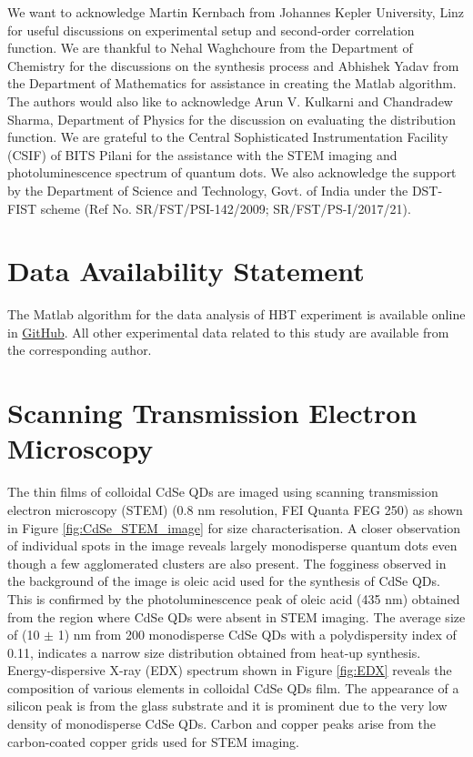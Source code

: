 \documentclass[%
 aip,
 amsmath,amssymb,
 reprint,%
]{revtex4-1}
\begin{document}
\begin{acknowledgments}
We want to acknowledge Martin Kernbach from Johannes Kepler University, Linz for useful discussions on experimental setup and second-order correlation function. We are thankful to Nehal Waghchoure from the Department of Chemistry for the discussions on the synthesis process and Abhishek Yadav from the Department of Mathematics for assistance in creating the Matlab algorithm. The authors would also like to acknowledge Arun V. Kulkarni and Chandradew Sharma, Department of Physics for the discussion on evaluating the distribution function. We are grateful to the Central Sophisticated Instrumentation Facility (CSIF) of BITS Pilani for the assistance with the STEM imaging and photoluminescence spectrum of quantum dots.  We also acknowledge the support by the Department of Science and Technology, Govt. of India under the DST-FIST scheme (Ref No. SR/FST/PSI-142/2009; SR/FST/PS-I/2017/21).
\end{acknowledgments}

\section*{Data Availability Statement}
The Matlab algorithm for the data analysis of HBT experiment is available online in \href{https://github.com/hbtmatlab/g-2-for-photons/tree/main}{GitHub}. All other experimental data related to this study are available from the corresponding author.



\appendix
\section{\textbf{Scanning Transmission Electron Microscopy}}
The thin films of colloidal CdSe QDs are imaged using scanning transmission electron microscopy (STEM) (0.8 nm resolution, FEI Quanta FEG 250) as shown in Figure \ref{fig:CdSe_STEM_image} for size characterisation. A closer observation of individual spots in the image reveals largely monodisperse quantum dots even though a few agglomerated clusters are also present. The fogginess observed in the background of the image is oleic acid used for the synthesis of CdSe QDs. This is confirmed by the photoluminescence peak of oleic acid (435 nm) obtained from the region where CdSe QDs were absent in STEM imaging. The average size of (10 $\pm$ 1) nm from 200 monodisperse CdSe QDs with a polydispersity index of 0.11, indicates a narrow size distribution obtained from heat-up synthesis. Energy-dispersive X-ray (EDX) spectrum shown in Figure \ref{fig:EDX} reveals the composition of various elements in colloidal CdSe QDs film. The appearance of a silicon peak is from the glass substrate and it is prominent due to the very low density of monodisperse CdSe QDs. Carbon and copper peaks arise from the carbon-coated copper grids used for STEM imaging.
\end{document}
